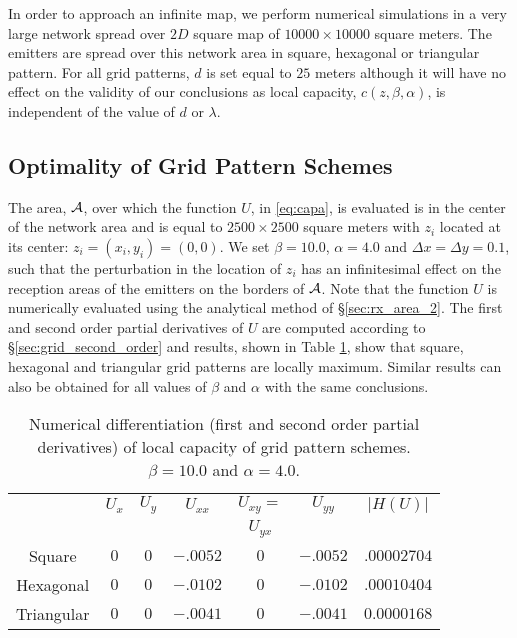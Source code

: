 \documentclass[12pt,english]{article}
\begin{document}
In order to approach an infinite map, we perform numerical simulations in a very large network spread over $2D$ square map of $10000\times10000$ square meters. The emitters are spread over this network area in square, hexagonal or triangular pattern. For all grid patterns, \mbox{$d$} is set equal to $25$ meters although it will have no effect on the validity of our conclusions as local capacity, $c(z,\beta,\alpha)$, is independent of the value of $d$ or $\lambda$. 


\subsection{Optimality of Grid Pattern Schemes}
\label{sec:sub_opti}

The area, ${\cal A}$, over which the function $U$, in \eqref{eq:capa}, is evaluated is in the center of the network area and is equal to \mbox{$2500\times2500$} square meters with $z_i$ located at its center: \mbox{$z_{i}=(x_{i},y_{i})=(0,0)$}. We set \mbox{$\beta=10.0$}, \mbox{$\alpha=4.0$} and \mbox{$\Delta x=\Delta y=0.1$}, such that the perturbation in the location of $z_i$ has an infinitesimal effect on the reception areas of the emitters on the borders of ${\cal A}$. Note that the function $U$ is numerically evaluated using the analytical method of \S \ref{sec:rx_area_2}. The first and second order partial derivatives of $U$ are computed according to \S \ref{sec:grid_second_order} and results, shown in Table \ref{tbl:comparison}, show that square, hexagonal and triangular grid patterns are locally maximum. Similar results can also be obtained for all values of $\beta$ and $\alpha$ with the same conclusions.

{\small 
\begin{table}[!t]
\begin{center}
\begin{tabular}{|c|c|c|c|c|c|c|}
\hline
     & $U_x$	& $U_y$	& $U_{xx}$	& $U_{xy}=$	& $U_{yy}$ 	& $|H(U)|$\\
     &		&		&		& $U_{yx}$	&		&		\\
   \hline

    Square   	  &  $0$ &   $0$  & $-.0052$ & $0$ & $-.0052$ & $.00002704$ \\
    \hline
    Hexagonal  &  $0$ &   $0$  & $-.0102$ & $0$ & $-.0102$ & $.00010404$ \\
    \hline
    Triangular   &  $0$ &   $0$  & $-.0041$ & $0$ & $-.0041$ & $0.0000168$ \\
       \hline
\end{tabular}
\end{center}
\caption{\footnotesize Numerical differentiation (first and second order partial derivatives) of local capacity of grid pattern schemes. $\beta=10.0$ and $\alpha=4.0$.}
\label{tbl:comparison}
\end{table}
}
\end{document}
